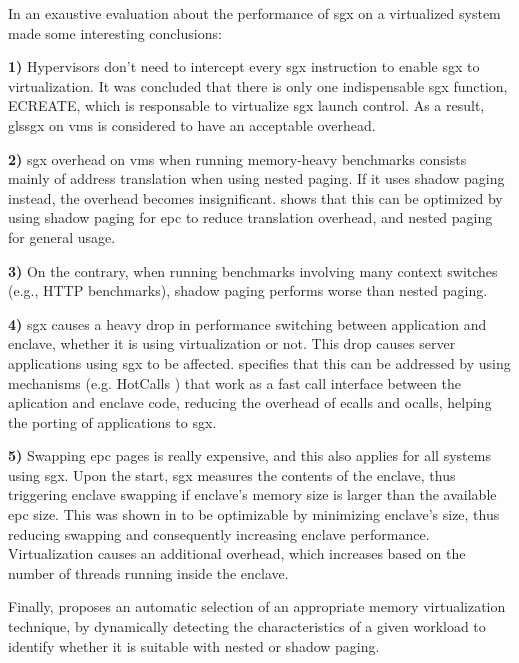 In \cite{sgxVirtualizationPaper} an exaustive evaluation about the performance of \gls{sgx} on a virtualized system made some interesting conclusions:

\textbf{1)} Hypervisors don't need to intercept every \gls{sgx} instruction to enable \gls{sgx} to virtualization. It was concluded that there is only one indispensable \gls{sgx} function, ECREATE, which is responsable to virtualize \gls{sgx} launch control. As a result, gls{sgx} on \gls{vm}s is considered to have an acceptable overhead.

\textbf{2)} \gls{sgx} overhead on \gls{vm}s when running memory-heavy benchmarks consists mainly of address translation when using nested paging. If it uses shadow paging instead, the overhead becomes insignificant. 
\cite{sgxVirtualizationPaper} shows that this can be optimized by using shadow paging for \gls{epc} to reduce translation overhead, and nested paging for general usage.

\textbf{3)} On the contrary, when running benchmarks involving many context switches (e.g., HTTP benchmarks), shadow paging performs worse than nested paging.

\textbf{4)} \gls{sgx} causes a heavy drop in performance switching between application and enclave, whether it is using virtualization or not. This drop causes server applications using \gls{sgx} to be affected.
\cite{sgxVirtualizationPaper} specifies that this can be addressed by using mechanisms (e.g. HotCalls \cite{hotcallsPaper}) that work as a fast call interface between the aplication and enclave code, reducing the overhead of ecalls and ocalls, helping the porting of applications to \gls{sgx}.

\textbf{5)} Swapping \gls{epc} pages is really expensive, and this also applies for all systems using \gls{sgx}. 
Upon the start, \gls{sgx} measures the contents of the enclave, thus triggering enclave swapping if enclave's memory size is larger than the available \gls{epc} size. 
This was shown in \cite{sgxVirtualizationPaper} to be optimizable by minimizing enclave's size, thus reducing swapping and consequently increasing enclave performance.
Virtualization causes an additional overhead, which increases based on the number of threads running inside the enclave.

Finally, \cite{sgxVirtualizationPaper} proposes an automatic selection of an appropriate memory virtualization technique, by dynamically detecting the characteristics of a given workload to identify whether it is suitable with nested or shadow paging.\newline

